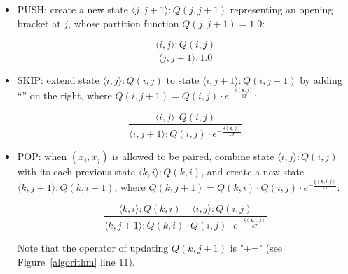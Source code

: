 \begin{itemize}
\item PUSH: create a new state $\langle j,j+1 \rangle:Q(j,j+1)$ representing an opening bracket at $j$,
whose partition function $Q(j,j+1)=1.0$: 

	\begin{equation*}
		\frac{\langle i,j \rangle : Q(i,j)}{\langle j,j+1 \rangle : 1.0}
	\end{equation*}

\item SKIP: extend state $\langle i,j \rangle:Q(i,j)$ to state $\langle i,j+1 \rangle:Q(i,j+1)$ 
by adding ``\md'' on the right,
where $Q(i,j+1)=Q(i,j) \cdot e^{-\frac{\delta(\mathbf{x}, j)}{kT}}$:

	\begin{equation*}
		\frac{\langle i,j \rangle : Q(i,j)}{\langle i,j+1 \rangle : Q(i,j) \cdot e^{-\frac{\delta(\mathbf{x}, j)}{kT}}}
	\end{equation*}

\item POP: when $(x_i, x_j)$ is allowed to be paired, 
combine state $\langle i,j \rangle:Q(i,j)$ 
with its each previous state $\langle k,i \rangle:Q(k,i)$,
and create a new state $\langle k,j+1 \rangle:Q(k,i+1)$,
where $Q(k,j+1)=Q(k,i) \cdot Q(i,j) \cdot e^{-\frac{\xi(\mathbf{x}, i, j)}{kT}}$:

	\begin{equation*}
		\frac{\langle k,i \rangle : Q(k,i) \ \ \ \ \ \langle i,j \rangle : Q(i,j)}{\langle k,j+1 \rangle : Q(k,i) \cdot Q(i,j) \cdot e^{-\frac{\xi(\mathbf{x}, i, j)}{kT}}}
	\end{equation*}

Note that the operator of updating $Q(k,j+1)$ is "+=" (see Figure~\ref{algorithm} line 11).

\end{itemize}




